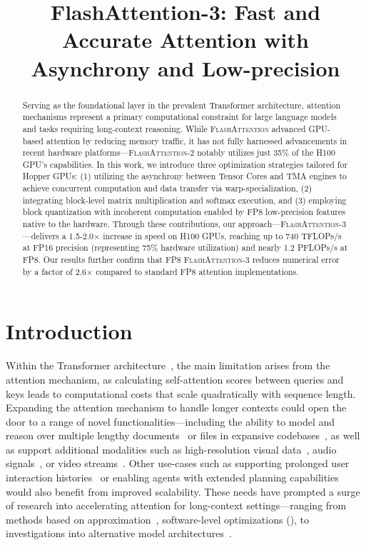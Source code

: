 \title{FlashAttention-3: Fast and Accurate Attention with Asynchrony and Low-precision}

\begin{abstract}
Serving as the foundational layer in the prevalent Transformer architecture, attention mechanisms represent a primary computational constraint for large language models and tasks requiring long-context reasoning. While \textsc{FlashAttention} advanced GPU-based attention by reducing memory traffic, it has not fully harnessed advancements in recent hardware platforms—\textsc{FlashAttention-2} notably utilizes just 35\% of the H100 GPU's capabilities. In this work, we introduce three optimization strategies tailored for Hopper GPUs: (1) utilizing the asynchrony between Tensor Cores and TMA engines to achieve concurrent computation and data transfer via warp-specialization, (2) integrating block-level matrix multiplication and softmax execution, and (3) employing block quantization with incoherent computation enabled by FP8 low-precision features native to the hardware. Through these contributions, our approach—\textsc{FlashAttention-3}—delivers a 1.5-2.0$\times$ increase in speed on H100 GPUs, reaching up to 740 TFLOPs/s at FP16 precision (representing 75\% hardware utilization) and nearly 1.2 PFLOPs/s at FP8. Our results further confirm that FP8 \textsc{FlashAttention-3} reduces numerical error by a factor of 2.6$\times$ compared to standard FP8 attention implementations.
\end{abstract}

\section{Introduction}
\label{sec:intro}

Within the Transformer architecture~\citep{vaswani2017attention}, the main limitation arises from the attention mechanism, as calculating self-attention scores between queries and keys leads to computational costs that scale quadratically with sequence length. Expanding the attention mechanism to handle longer contexts could open the door to a range of novel functionalities—including the ability to model and reason over multiple lengthy documents~\citep{guo2021longt5,shaham2022scrolls,peng2023yarn} or files in expansive codebases~\citep{roziere2023code, li2023starcoder}, as well as support additional modalities such as high-resolution visual data~\citep{chen2022scaling}, audio signals~\citep{gulati2020conformer}, or video streams~\citep{ho2022video}. Other use-cases such as supporting prolonged user interaction histories~\citep{sun2019bert4rec} or enabling agents with extended planning capabilities~\citep{yao2022react} would also benefit from improved scalability. These needs have prompted a surge of research into accelerating attention for long-context settings—ranging from methods based on approximation~\citep{katharopoulos2020transformers,choromanski2020rethinking,
tay2020efficient}, software-level optimizations (\citep{rabe2021self,dao2022flashattention,kwon2023efficient}), to investigations into alternative model architectures~\citep{peng2023rwkv,sun2023retentive,gu2023mamba}.

